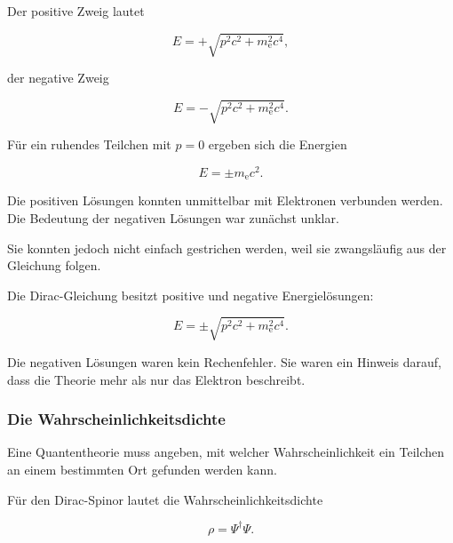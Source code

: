 Der positive Zweig lautet

\begin{equation}
	E
	=
	+
	\sqrt{
		p^2c^2
		+
		m_{\mathrm e}^2c^4
	},
\end{equation}

der negative Zweig

\begin{equation}
	E
	=
	-
	\sqrt{
		p^2c^2
		+
		m_{\mathrm e}^2c^4
	}.
\end{equation}

Für ein ruhendes Teilchen mit \(p=0\) ergeben sich die Energien

\begin{equation}
	E
	=
	\pm m_{\mathrm e}c^2.
	\label{eq:ruheenergien_dirac}
\end{equation}

Die positiven Lösungen konnten unmittelbar mit Elektronen verbunden
werden. Die Bedeutung der negativen Lösungen war zunächst unklar.

Sie konnten jedoch nicht einfach gestrichen werden, weil sie
zwangsläufig aus der Gleichung folgen.

\begin{PhysicsBox}
	\label{box:zwei_energiezweige_dirac}
	
	Die Dirac-Gleichung besitzt positive und negative Energielösungen:
	
	\begin{equation}
		E
		=
		\pm
		\sqrt{
			p^2c^2
			+
			m_{\mathrm e}^2c^4
		}.
	\end{equation}
	
	Die negativen Lösungen waren kein Rechenfehler. Sie waren ein Hinweis
	darauf, dass die Theorie mehr als nur das Elektron beschreibt.
\end{PhysicsBox}

\subsubsection*{Die Wahrscheinlichkeitsdichte}

Eine Quantentheorie muss angeben, mit welcher Wahrscheinlichkeit ein
Teilchen an einem bestimmten Ort gefunden werden kann.

Für den Dirac-Spinor lautet die Wahrscheinlichkeitsdichte%

\begin{equation}
	\rho
	=
	\Psi^\dagger\Psi.
	\label{eq:wahrscheinlichkeitsdichte_dirac_kapitel07}
\end{equation}

